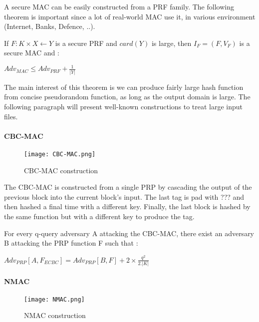 A secure MAC can be easily constructed from a PRF family. The following theorem is important since a lot of real-world MAC use it, in various environment (Internet, Banks, Defence, ..). 

\begin{mytheorem}
    If $F:K\times X \leftarrow Y$ is a secure PRF and $card(Y)$ is large, then $I_F = (F, V_F)$ is a secure MAC and : 
   	\begin{flushright}
	    $ Adv_{MAC} \leq Adv_{PRF} + \frac{1}{|Y|} $
	\end{flushright}
\end{mytheorem}

The main interest of this theorem is we can produce fairly large hash function from concise pseudorandom function, as long as the output domain is large. The following paragraph will present well-known constructions to treat large input files.

\paragraph{CBC-MAC}

\begin{figure}[h!]
	\centering
		\texttt{[image: CBC-MAC.png]}
	\caption{CBC-MAC construction}
	\label{fig:CBCMACConstruction}
\end{figure}

The CBC-MAC is constructed from a single PRP by cascading the output of the previous block into the current block's input. The last tag is pad with ??? and then hashed a final time with a different key. Finally, the last block is hashed by the same function but with a different key to produce the tag.

\begin{mytheorem}
	For every q-query adversary A attacking the CBC-MAC, there exist an adversary B attacking the PRP function F such that : 
	\begin{flushright}
 		$Adv_{PRP}[A,F_{ECBC}] = Adv_{PRP}[B, F] + 2\times \frac{q^2}{2.|K|}$	
	\end{flushright}
\end{mytheorem}



\paragraph{NMAC}


\begin{figure}[h!]
	\centering
		\texttt{[image: NMAC.png]}
	\caption{NMAC construction}
	\label{fig:NMACConstruction}
\end{figure}

